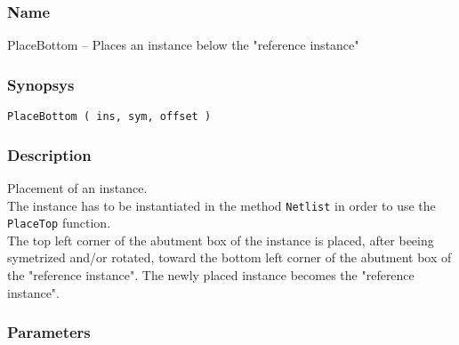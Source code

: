 \subsubsection{Name}

PlaceBottom -- Places an instance below the "reference instance"

\subsubsection{Synopsys}

\begin{verbatim}
PlaceBottom ( ins, sym, offset )
\end{verbatim}

\subsubsection{Description}

Placement of an instance.\\
\indent The instance has to be instantiated in the method \verb-Netlist- in order to use the \verb-PlaceTop- function.\\
    
\indent The top left corner of the abutment box of the instance is placed, after beeing symetrized and/or rotated, toward the bottom left corner of the abutment box of the "reference instance". The newly placed instance becomes the "reference instance".

\subsubsection{Parameters}

